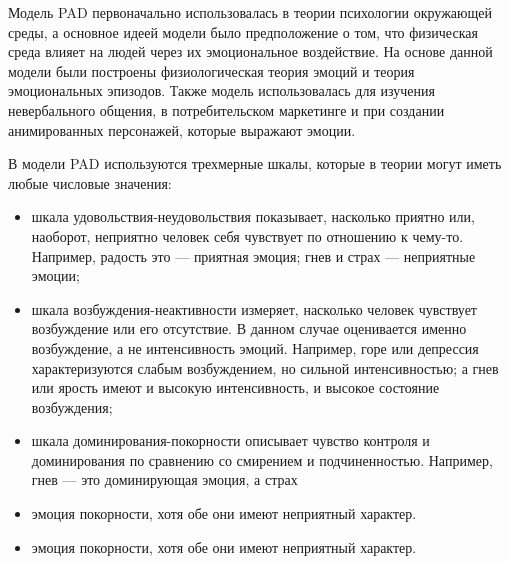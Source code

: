 Модель PAD первоначально использовалась в теории психологии окружающей среды, а основное идеей модели было предположение о том,
что физическая среда влияет на людей через их эмоциональное воздействие. На основе данной модели были построены физиологическая 
теория эмоций и теория эмоциональных эпизодов. Также модель использовалась для изучения невербального общения, в потребительском 
маркетинге и при создании анимированных персонажей, которые выражают эмоции.

В модели PAD используются трехмерные шкалы, которые в теории могут иметь любые числовые значения:
\begin{itemize}
	\item шкала удовольствия-неудовольствия показывает, насколько приятно или, наоборот, неприятно человек себя чувствует по отношению к чему-то. Например, радость это — приятная эмоция; гнев и страх — неприятные эмоции;
	\item шкала возбуждения-неактивности измеряет, насколько человек чувствует возбуждение или его отсутствие. В данном случае оценивается именно возбуждение, а не интенсивность эмоций. Например, горе или депрессия характеризуются слабым возбуждением, но сильной интенсивностью; а гнев или ярость имеют и высокую интенсивность, и высокое состояние возбуждения;
	\item шкала доминирования-покорности описывает чувство контроля и доминирования по сравнению со смирением и подчиненностью. Например, гнев — это доминирующая эмоция, а страх
	\item эмоция покорности, хотя обе они имеют неприятный характер.
	\item эмоция покорности, хотя обе они имеют неприятный характер.
\end{itemize}

